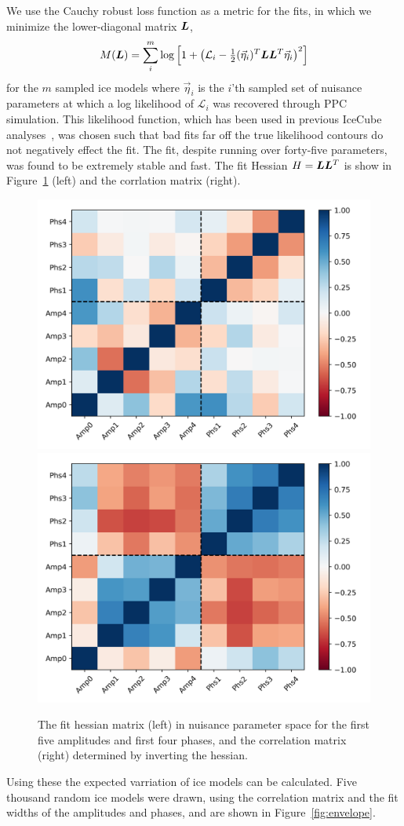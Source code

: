 \documentclass[main.tex]{subfiles}
\begin{document}
We use the Cauchy robust loss function as a metric for the fits, in which we minimize the lower-diagonal matrix $\bm{L}$,
\begin{equation}
    M(\bm{L}) = \sum_{i}^{m}\log\left[ 1 +  \left(\mathcal{L}_{i} - \tfrac{1}{2}(\vec{\eta}_{i})^{T} \bm{L}\bm{L}^{T} \vec{\eta}_ {i} \right)^{2}\right]
\end{equation}
for the $m$ sampled ice models where $\vec{\eta}_{i}$ is the $i$'th sampled set of nuisance parameters at which a log likelihood of $\mathcal{L}_{i}$ was recovered through PPC simulation. 
This likelihood function, which has been used in previous IceCube analyses~\cite{icecube_lowe}, was chosen such that bad fits far off the true likelihood contours do not negatively effect the fit.  
The fit, despite running over forty-five parameters, was found to be extremely stable and fast. The fit Hessian $H=\bm{L}\bm{L}^{T}$ is show in Figure~\ref{fig:hessian} (left) and the corrlation matrix (right).
\begin{figure}
    \centering
    \includegraphics[width=0.45\linewidth]{figures/hessian.png}%
    \includegraphics[width=0.45\linewidth]{figures/covariance.png}
    \caption{The fit hessian matrix (left) in nuisance parameter space for the first five amplitudes and first four phases, and the correlation matrix (right) determined by inverting the hessian.}\label{fig:hessian}
\end{figure}

Using these the expected varriation of ice models can be calculated. 
Five thousand random ice models were drawn, using the correlation matrix and the fit widths of the amplitudes and phases, and are shown in Figure~\ref{fig:envelope}.
\end{document}
